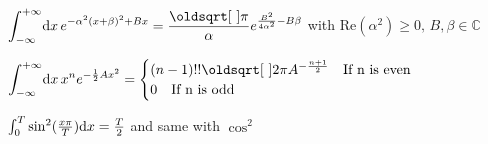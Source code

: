 \begin{squishlist}
    \item $\displaystyle{\int_{-\infty}^{+\infty}} \ud x \, e^{-\alpha^2(x+\beta)^2 + Bx} = \dfrac{\sqrt{\pi}}{\alpha} \displaystyle{e^{\frac{B^2}{4\alpha^2}-B\beta}} $ with Re$(\alpha^2) \ge 0, \, B, \beta \in \mathbb{C}$ 
    
    \item $      \displaystyle{\int_{-\infty}^{+\infty}} \ud x \, x^n e^{-\frac{1}{2}Ax^2} = 
    \begin{cases}
    (n-1)!!\sqrt{2\pi}A^{-\frac{n+1}{2}} \quad \text{If n is even} \\
    0 \quad \text{If n is odd}
    \end{cases}
    $

    \item $\int_{0}^{T} \sin^2(\frac{x \pi}{T}) \textrm{d} x = \frac{T}{2}$ and same with $\cos^2$
\end{squishlist}


\columnbreak



